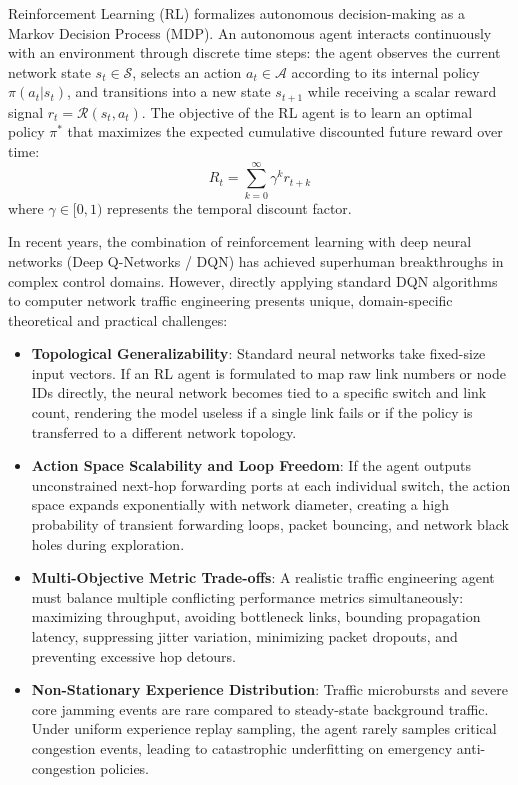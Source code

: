 \documentclass[12pt,a4paper,oneside]{report}
\begin{document}
Reinforcement Learning (RL) formalizes autonomous decision-making as a Markov Decision Process (MDP). An autonomous agent interacts continuously with an environment through discrete time steps: the agent observes the current network state $s_t \in \mathcal{S}$, selects an action $a_t \in \mathcal{A}$ according to its internal policy $\pi(a_t|s_t)$, and transitions into a new state $s_{t+1}$ while receiving a scalar reward signal $r_t = \mathcal{R}(s_t, a_t)$. The objective of the RL agent is to learn an optimal policy $\pi^*$ that maximizes the expected cumulative discounted future reward over time:
\begin{equation}
    R_t = \sum_{k=0}^{\infty} \gamma^k r_{t+k}
\end{equation}
where $\gamma \in [0, 1)$ represents the temporal discount factor.

In recent years, the combination of reinforcement learning with deep neural networks (Deep Q-Networks / DQN) has achieved superhuman breakthroughs in complex control domains. However, directly applying standard DQN algorithms to computer network traffic engineering presents unique, domain-specific theoretical and practical challenges:
\begin{itemize}
    \item \textbf{Topological Generalizability}: Standard neural networks take fixed-size input vectors. If an RL agent is formulated to map raw link numbers or node IDs directly, the neural network becomes tied to a specific switch and link count, rendering the model useless if a single link fails or if the policy is transferred to a different network topology.
    \item \textbf{Action Space Scalability and Loop Freedom}: If the agent outputs unconstrained next-hop forwarding ports at each individual switch, the action space expands exponentially with network diameter, creating a high probability of transient forwarding loops, packet bouncing, and network black holes during exploration.
    \item \textbf{Multi-Objective Metric Trade-offs}: A realistic traffic engineering agent must balance multiple conflicting performance metrics simultaneously: maximizing throughput, avoiding bottleneck links, bounding propagation latency, suppressing jitter variation, minimizing packet dropouts, and preventing excessive hop detours.
    \item \textbf{Non-Stationary Experience Distribution}: Traffic microbursts and severe core jamming events are rare compared to steady-state background traffic. Under uniform experience replay sampling, the agent rarely samples critical congestion events, leading to catastrophic underfitting on emergency anti-congestion policies.
\end{itemize}
\end{document}
